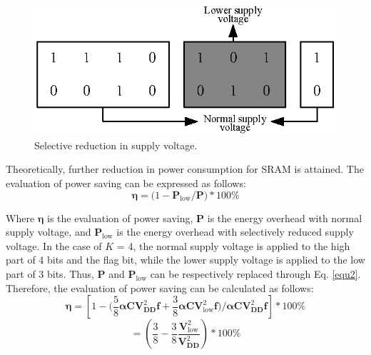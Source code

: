 \documentclass[lettersize,journal]{IEEEtran}
\begin{document}
\begin{figure}[htb]
\centering
\includegraphics[width=\linewidth]{Fig/Selective reduction in supply voltage.png}
\caption{Selective reduction in supply voltage.}
\label{fig12}
\end{figure}

Theoretically, further reduction in power consumption for SRAM is attained. The evaluation of power saving can be expressed as follows:  
\begin{equation}
\label{equ2}
\boldsymbol{\eta }=\text{(}1-\boldsymbol{P}{{_{\mathrm{low}}}/{\boldsymbol{P}}}\text{)}*100\%
\end{equation}

Where $\boldsymbol{\eta}$ is the evaluation of power saving, $\boldsymbol{P}$ is the energy overhead with normal supply voltage, and $\boldsymbol{P_{\mathrm{low}}}$ is the energy overhead with selectively reduced supply voltage. In the case of $K$ = 4, the normal supply voltage is applied to the high part of 4 bits and the flag bit, while the lower supply voltage is applied to the low part of 3 bits. Thus, $\boldsymbol{P}$ and $\boldsymbol{P_{\mathrm{low}}}$ can be respectively replaced through Eq. \eqref{equ2}. Therefore, the evaluation of power saving can be calculated as follows:
$$
\boldsymbol{\eta }=[1-(\frac{5}{8}\boldsymbol{\alpha CV}_{\boldsymbol{DD}}^{2}\boldsymbol{f}+\frac{3}{8}\boldsymbol{\alpha CV}_{\mathrm{low}}^{2}\boldsymbol{f}{)/{\boldsymbol{\alpha }}}\boldsymbol{CV}_{\boldsymbol{DD}}^{2}\boldsymbol{f}]*100\% 
$$
\begin{equation}
\label{equ3} 
=(\frac{3}{8}-\frac{3}{8}\frac{\boldsymbol{V}_{\mathrm{low}}^{2}}{\boldsymbol{V}_{\boldsymbol{DD}}^{2}})*100\%
\end{equation}
\end{document}
